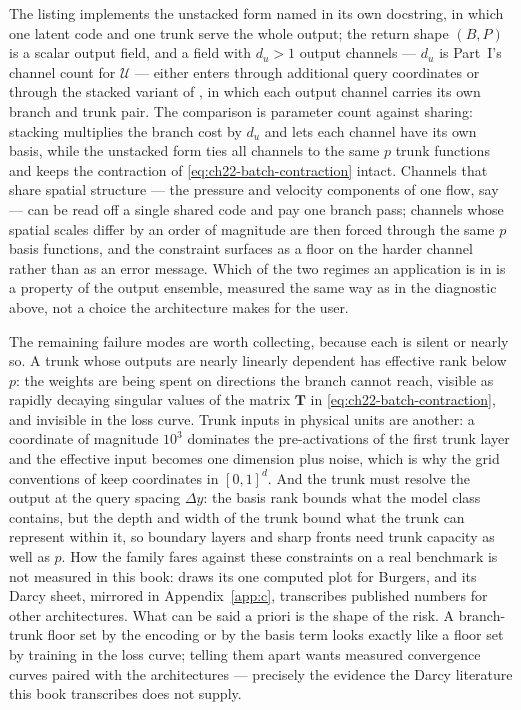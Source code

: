 The listing implements the unstacked form named in its own docstring, in which one latent code
and one trunk serve the whole output; the return shape $(B,P)$ is a scalar output field, and a
field with $d_u > 1$ output channels --- $d_u$ is Part~I's channel count for
$\mathcal{U}$ --- either enters through additional query coordinates or through the stacked
variant of \cite{lu2021learning}, in which each output channel carries its own branch and
trunk pair. The comparison is parameter count
against sharing: stacking multiplies the branch cost by $d_u$ and lets each channel have its
own basis, while the unstacked form ties all channels to the same $p$ trunk functions and
keeps the contraction of \eqref{eq:ch22-batch-contraction} intact. Channels that share spatial
structure --- the pressure and velocity components of one flow, say --- can be read off a single
shared code and pay one branch pass; channels whose spatial scales differ by an order of
magnitude are then forced through the same $p$ basis functions, and the constraint surfaces as
a floor on the harder channel rather than as an error message. Which of the two regimes an
application is in is a property of the output ensemble, measured the same way as in the
diagnostic above, not a choice the architecture makes for the user.

The remaining failure modes are worth collecting, because each is silent or nearly so. A trunk
whose outputs are nearly linearly dependent has effective rank below $p$: the weights are
being spent on directions the branch cannot reach, visible as rapidly decaying singular values
of the matrix $\mathbf{T}$ in \eqref{eq:ch22-batch-contraction}, and invisible in the loss
curve. Trunk inputs in physical units are another: a coordinate of magnitude $10^{3}$
dominates the pre-activations of the first trunk layer and the effective input becomes one
dimension plus noise, which is why the grid conventions of
 keep coordinates in $[0,1]^d$.
And the trunk must resolve the output at the query spacing $\Delta y$: the basis rank bounds
what the model class contains, but the depth and width of the trunk bound what the trunk can
represent within it, so boundary layers and sharp fronts need trunk capacity as well as
$p$. How the family fares against these constraints on a real benchmark is not
measured in this book:
 draws its one computed plot for Burgers, and its Darcy
sheet, mirrored in Appendix~\ref{app:c}, transcribes published numbers for other
architectures. What can be said a priori is the shape of the risk. A branch-trunk
floor set by the encoding or by the basis term looks exactly like a floor set by
training in the loss curve; telling them apart wants measured convergence curves
paired with the architectures --- precisely the evidence the Darcy literature this
book transcribes does not supply.

